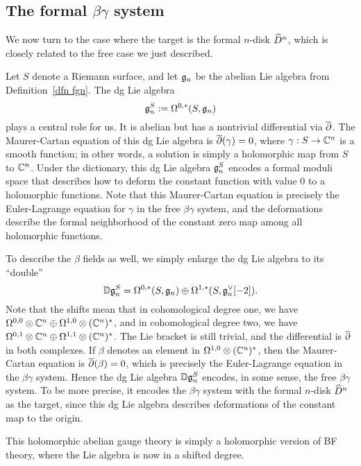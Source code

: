 \subsection{The formal $\beta\gamma$ system}

We now turn to the case where the target is the formal $n$-disk $\widehat{D}^n$,
which is closely related to the free case we just described.

Let $S$ denote a Riemann surface, and let $\mathfrak g_n$ be the abelian Lie algebra from Definition~\ref{dfn fgn}.
The dg Lie algebra $$\mathfrak g_n^S := \Omega^{0,*}(S,\mathfrak g_n)$$ plays a central role for us.
It is abelian but has a nontrivial differential via $\overline{\partial}$.
The Maurer-Cartan equation of this dg Lie algebra is $\overline{\partial}(\gamma) = 0$, where $\gamma: S \to \mathbb C^n$ is a smooth function;
in other words, a solution is simply a holomorphic map from $S$ to $\mathbb C^n$.
Under the dictionary, this dg Lie algebra $\mathfrak g^S_n$ encodes a formal moduli space that describes how to deform the constant function with value $0$ to a holomorphic functions.
Note that this Maurer-Cartan equation is precisely the Euler-Lagrange equation for $\gamma$ in the free $\beta\gamma$ system,
and the deformations describe the formal neighborhood of the constant zero map among all holomorphic functions.

To describe the $\beta$ fields as well, we simply enlarge the dg Lie algebra to its ``double''
\[
\mathbb D \mathfrak g_n^S = \Omega^{0,*}(S, \mathfrak g_n) \oplus \Omega^{1,*}(S, \mathfrak g_n^\vee[-2]).
\]
Note that the shifts mean that in cohomological degree one, we have $\Omega^{0,0} \otimes \mathbb C^n \oplus \Omega^{1,0} \otimes (\mathbb C^n)^*$, 
and in cohomological degree two, we have $\Omega^{0,1} \otimes \mathbb C^n \oplus \Omega^{1,1} \otimes (\mathbb C^n)^*$.
The Lie bracket is still trivial, and the differential is $\overline{\partial}$ in both complexes. 
If $\beta$ denotes an element in $\Omega^{1,0} \otimes (\mathbb C^n)^*$,
then the Maurer-Cartan equation is $\overline{\partial}(\beta) = 0$, which is precisely the Euler-Lagrange equation in the $\beta\gamma$ system.
Hence the dg Lie algebra $\mathbb D \mathfrak g_n^S$ encodes, in some sense, the free $\beta\gamma$ system.
To be more precise, it encodes the $\beta\gamma$ system with the formal $n$-disk $\widehat{D}^n$ as the target,
since this dg Lie algebra describes deformations of the constant map to the origin.

\begin{rmk}
This holomorphic abelian gauge theory is simply a holomorphic version of BF theory, where the Lie algebra is now in a shifted degree.
\end{rmk}

